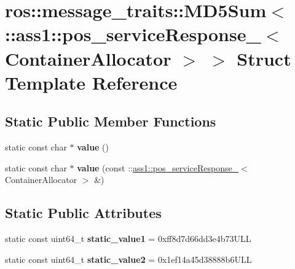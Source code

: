 \hypertarget{structros_1_1message__traits_1_1MD5Sum_3_01_1_1ass1_1_1pos__serviceResponse___3_01ContainerAllocator_01_4_01_4}{}\section{ros\+:\+:message\+\_\+traits\+:\+:M\+D5\+Sum$<$ \+:\+:ass1\+:\+:pos\+\_\+service\+Response\+\_\+$<$ Container\+Allocator $>$ $>$ Struct Template Reference}
\label{structros_1_1message__traits_1_1MD5Sum_3_01_1_1ass1_1_1pos__serviceResponse___3_01ContainerAllocator_01_4_01_4}
\subsection*{Static Public Member Functions}
\begin{DoxyCompactItemize}
\item 
\mbox{\label{structros_1_1message__traits_1_1MD5Sum_3_01_1_1ass1_1_1pos__serviceResponse___3_01ContainerAllocator_01_4_01_4_ae9605fe5b386c65edd5bf546735219e8}} 
static const char $\ast$ {\bfseries value} ()
\item 
\mbox{\label{structros_1_1message__traits_1_1MD5Sum_3_01_1_1ass1_1_1pos__serviceResponse___3_01ContainerAllocator_01_4_01_4_af9e67aebc0e09b1378463b62f1d5caef}} 
static const char $\ast$ {\bfseries value} (const \+::\hyperlink{structass1_1_1pos__serviceResponse__}{ass1\+::pos\+\_\+service\+Response\+\_\+}$<$ Container\+Allocator $>$ \&)
\end{DoxyCompactItemize}
\subsection*{Static Public Attributes}
\begin{DoxyCompactItemize}
\item 
\mbox{\label{structros_1_1message__traits_1_1MD5Sum_3_01_1_1ass1_1_1pos__serviceResponse___3_01ContainerAllocator_01_4_01_4_a4f32caf708a84fdda24808c8e77e8d7f}} 
static const uint64\+\_\+t {\bfseries static\+\_\+value1} = 0xff8d7d66dd3e4b73\+U\+LL
\item 
\mbox{\label{structros_1_1message__traits_1_1MD5Sum_3_01_1_1ass1_1_1pos__serviceResponse___3_01ContainerAllocator_01_4_01_4_a49c63866fb0274cee4dbc03801680ce4}} 
static const uint64\+\_\+t {\bfseries static\+\_\+value2} = 0x1ef14a45d38888b6\+U\+LL
\end{DoxyCompactItemize}


